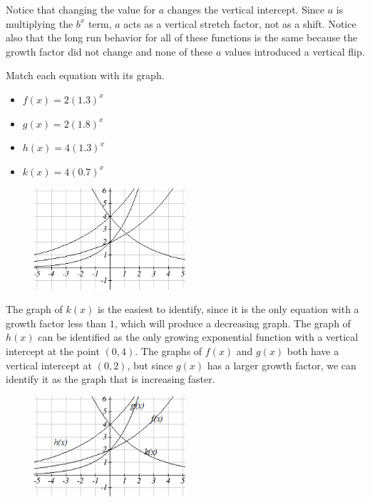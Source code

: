 Notice that changing the value for $a$ changes the vertical intercept. Since $a$ is multiplying the $b^x$ term, $a$ acts as a vertical stretch factor, not as a shift. Notice also that the long run behavior for all of these functions is the same because the growth factor did not change and none of these $a$ values introduced a vertical flip.


\begin{example}
Match each equation with its graph.
\begin{itemize}
  \item[] $f(x)=2(1.3)^x$
  \item[] $g(x)=2(1.8)^x$
  \item[] $h(x)=4(1.3)^x$
  \item[] $k(x)=4(0.7)^x$
\end{itemize}
\begin{figure}[!ht]
\centering
\includegraphics[width=0.5\textwidth]{img/chap1/sec1-6/image076.png}
\caption{}
\end{figure}
\solution The graph of $k(x)$ is the easiest to identify, since it is the only equation with a growth factor less than $1$, which will produce a decreasing graph. The graph of $h(x)$ can be identified as the only growing exponential function with a vertical intercept at the point $(0,4)$. The graphs of $f(x)$ and $g(x)$ both have a vertical intercept at $(0,2)$, but since $g(x)$ has a larger growth factor, we can identify it as the graph that is increasing faster.

\begin{figure}[!ht]
\centering
\includegraphics[width=0.5\textwidth]{img/chap1/sec1-6/image077.png}
\caption{}
\end{figure}

\end{example}

